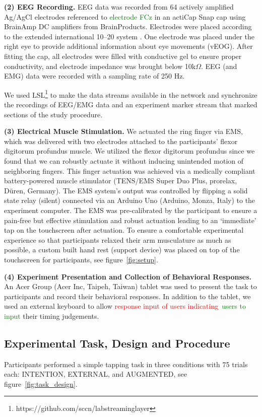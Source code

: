 \indent\textbf{(2) EEG Recording.} EEG data was recorded from 64 actively amplified Ag/AgCl electrodes referenced to \textcolor{green}{electrode FCz} in an actiCap Snap cap using BrainAmp DC amplifiers from BrainProducts. Electrodes were placed according to the extended international 10–20 system \cite{Jasper1983-uw}. One electrode was placed under the right eye to provide additional information about eye movements (vEOG). After fitting the cap, all electrodes were filled with conductive gel to ensure proper conductivity, and electrode impedance was brought below 10k$\Omega$. EEG (and EMG) data were recorded with a sampling rate of 250 Hz. 

We used LSL\footnote{https://github.com/sccn/labstreaminglayer} to make the data streams available in the network and synchronize the recordings of EEG/EMG data and an experiment marker stream that marked sections of the study procedure.

\indent\textbf{(3) Electrical Muscle Stimulation.} We actuated the ring finger via EMS, which was delivered with two electrodes attached to the participants' flexor digitorum profundus muscle. We utilized the flexor digitorum profundus since we found that we can robustly actuate it without inducing unintended motion of neighboring fingers. This finger actuation was achieved via a medically compliant battery-powered muscle stimulator (TENS/EMS Super Duo Plus, prorelax, Düren, Germany). The EMS system's output was controlled by flipping a solid state relay (silent) connected via an Arduino Uno (Arduino, Monza, Italy) to the experiment computer. The EMS was pre-calibrated by the participant to ensure a pain-free but effective stimulation and robust actuation leading to an `immediate' tap on the touchscreen after actuation. To ensure a comfortable experimental experience so that participants relaxed their arm musculature as much as possible, a custom built hand rest (support device) was placed on top of the touchscreen for participants, see figure~\ref{fig:setup}.

\indent\textbf{(4) Experiment Presentation and Collection of Behavioral Responses.} An Acer Group (Acer Inc, Taipeh, Taiwan) tablet was used to present the task to participants and record their behavioral responses. In addition to the tablet, we used an external keyboard to allow \textcolor{red}{response input of users indicating}~\textcolor{green}{users to input} their timing judgements.

\subsection{Experimental Task, Design and Procedure}
Participants performed a simple tapping task in three conditions with 75 trials each: INTENTION, EXTERNAL, and AUGMENTED, see figure~\ref{fig:task_design}.


